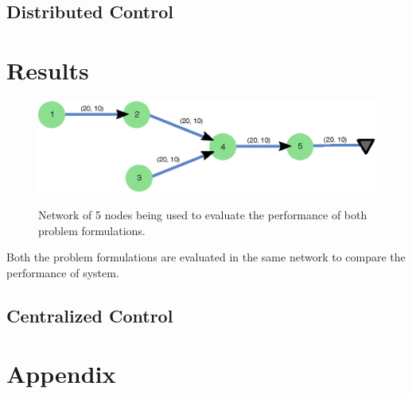 \documentclass{article}
\begin{document}
\subsection{Distributed Control}

\section{Results}
\begin{figure}[H]
	\includegraphics[width=\textwidth]{network.eps}
	\label{fig1}
	\caption{Network of 5 nodes being used to evaluate the performance of both problem formulations.}
\end{figure}

Both the problem formulations are evaluated in the same network to compare the performance of system. 

\subsection{Centralized Control}

\section{Appendix}
  
\end{document}

